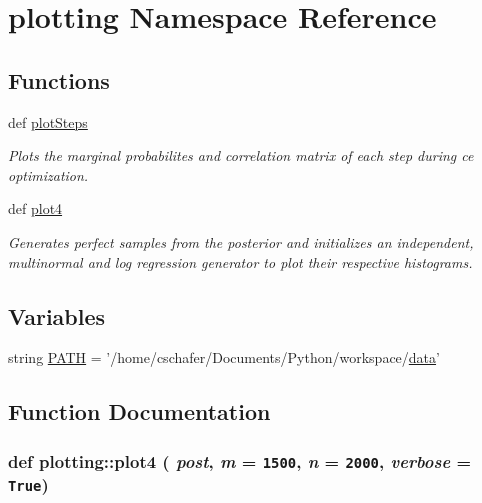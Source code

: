 \hypertarget{namespaceplotting}{
\section{plotting Namespace Reference}
\label{namespaceplotting}
}
\subsection*{Functions}
\begin{CompactItemize}
\item 
def \hyperlink{namespaceplotting_b505da9b5173fdd94b5900e8a9017160}{plotSteps}
\begin{CompactList}\small\item\em Plots the marginal probabilites and correlation matrix of each step during ce optimization. \item\end{CompactList}\item 
def \hyperlink{namespaceplotting_40bdd65430f0e2b3e2fbe73977a45976}{plot4}
\begin{CompactList}\small\item\em Generates perfect samples from the posterior and initializes an independent, multinormal and log regression generator to plot their respective histograms. \item\end{CompactList}\end{CompactItemize}
\subsection*{Variables}
\begin{CompactItemize}
\item 
string \hyperlink{namespaceplotting_9422d71ff1b0ed3d54e826072cbc5df6}{PATH} = '/home/cschafer/Documents/Python/workspace/\hyperlink{classsampling_1_1data}{data}'
\end{CompactItemize}


\subsection{Function Documentation}
\hypertarget{namespaceplotting_40bdd65430f0e2b3e2fbe73977a45976}{
\subsubsection[{plot4}]{\setlength{\rightskip}{0pt plus 5cm}def plotting::plot4 ( {\em post}, \/   {\em m} = {\tt 1500}, \/   {\em n} = {\tt 2000}, \/   {\em verbose} = {\tt True})}}
\label{namespaceplotting_40bdd65430f0e2b3e2fbe73977a45976}


